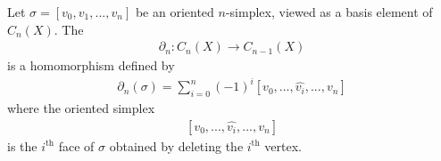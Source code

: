    \begin{definition}\label{def:simplicial-boundary-map}
        Let $\sigma = [v_0,v_1,...,v_n]$ be an oriented $n$-simplex, viewed as a basis element of $C_n(X)$. The 
            \begin{equation*}
            \begin{split}
                \partial_n : C_n(X) \rightarrow C_{n-1}(X)
            \end{split}
            \end{equation*}
        is a homomorphism defined by
            \begin{equation*}
            \begin{split}
                \partial_n(\sigma) = \sum_{i=0}^{n}(-1)^i [v_0,...,\hat{v_i},...,v_n]
            \end{split}
            \end{equation*}
        where the oriented simplex
            \begin{equation*}
            \begin{split}
                [v_0,...,\hat{v_i},...,v_n]
            \end{split}
            \end{equation*}
        is the $i^{\text{th}}$ face of $\sigma$ obtained by deleting the $i^{\text{th}}$ vertex.
    \end{definition}

